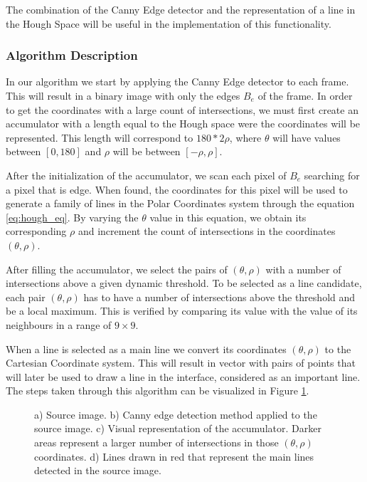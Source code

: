 The combination of the Canny Edge detector and the representation of a line in the Hough Space will be useful in the implementation of this functionality.

\subsubsection{Algorithm Description}

In our algorithm we start by applying the Canny Edge detector to each frame. This will result in a binary image with only the edges $B_{e}$ of the frame. In order to get the coordinates with a large count of intersections, we must first create an accumulator with a length equal to the Hough space were the coordinates will be represented. This length will correspond to $180 * 2\rho$, where $\theta$ will have values between $[0,180]$ and $\rho$ will be between $[-\rho,\rho]$.

After the initialization of the accumulator, we scan each pixel of $B_{e}$ searching for a pixel that is edge. When found, the coordinates for this pixel will be used to generate a family of lines in the Polar Coordinates system through the equation \ref{eq:hough_eq}. By varying the $\theta$ value in this equation, we obtain its corresponding $\rho$ and increment the count of intersections in the coordinates $(\theta,\rho)$.

After filling the accumulator, we select the pairs of $(\theta,\rho)$ with a number of intersections above a given dynamic threshold. To be selected as a line candidate, each pair $(\theta,\rho)$ has to have a number of intersections above the threshold and be a local maximum. This is verified by comparing its value with the value of its neighbours in a range of $9 \times 9$.

When a line is selected as a main line we convert its coordinates $(\theta,\rho)$ to the Cartesian Coordinate system. This will result in vector with pairs of points that will later be used to draw a line in the interface, considered as an important line. The steps taken through this algorithm can be visualized in Figure \ref{fig:hough_pipeline}.

\begin{figure}[htb]
	\centering
	\begin{minipage}[b][9cm]{0.5\textwidth}
  		\centering
  		\vfill
  		\vfill
  		\renewcommand{\thesubfigure}{(d)}
  	\end{minipage}
  	\renewcommand{\thesubfigure}{(c)}
	\caption{a) Source image. b) Canny edge detection method applied to the source image. c) Visual representation of the accumulator. Darker areas represent a larger number of intersections in those $(\theta,\rho)$ coordinates. d) Lines drawn in red that represent the main lines detected in the source image.}
    \label{fig:hough_pipeline}
\end{figure}

